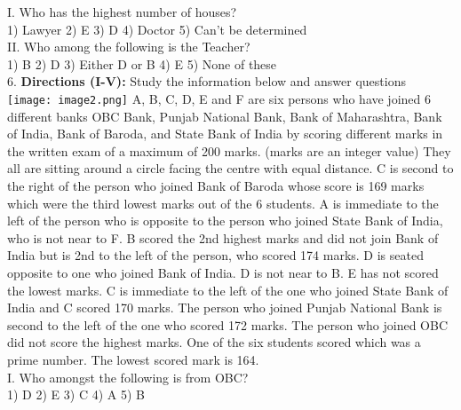 \documentclass[
]{article}
\begin{document}
I. Who has the highest number of houses?\\
1) Lawyer \hspace{2mm}2) E \hspace{2mm}3) D \hspace{2mm}4) Doctor \hspace{2mm}5) Can’t be determined\\

II. Who among the following is the Teacher?\\
1) B \hspace{2mm}2) D \hspace{2mm}3) Either D or B \hspace{2mm}4) E \hspace{2mm}5) None of these\\

6. \textbf{Directions (I-V):} Study the information below and answer questions\\
\texttt{[image: image2.png]}
A, B, C, D, E and F are six persons who have joined 6 different banks OBC Bank, Punjab
National Bank, Bank of Maharashtra, Bank of India, Bank of Baroda, and State Bank of India
by scoring different marks in the written exam of a maximum of 200 marks. (marks are an
integer value) They all are sitting around a circle facing the centre with equal distance. C is
second to the right of the person who joined Bank of Baroda whose score is 169 marks which
were the third lowest marks out of the 6 students. A is immediate to the left of the person who
is opposite to the person who joined State Bank of India, who is not near to F. B scored the
2nd highest marks and did not join Bank of India but is 2nd to the left of the person, who
scored 174 marks. D is seated opposite to one who joined Bank of India. D is not near to B. E
has not scored the lowest marks. C is immediate to the left of the one who joined State Bank
of India and C scored 170 marks. The person who joined Punjab National Bank is second to
the left of the one who scored 172 marks. The person who joined OBC did not score the highest
marks. One of the six students scored which was a prime number. The lowest scored mark is
164.\\

I. Who amongst the following is from OBC?\\
1) D \hspace{2mm}2) E \hspace{2mm}3) C \hspace{2mm}4) A \hspace{2mm}5) B\\
\end{document}
